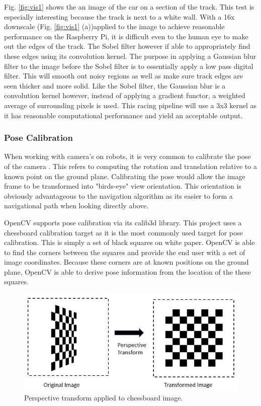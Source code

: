 \documentclass{article}
\begin{document}
Fig. \ref{fig:vis1} shows the an image of the car on a section of the track. This test is especially interesting because the track is next to a white wall. With a 16x downscale (Fig. \ref{fig:vis1} (a))applied to the image to achieve reasonable performance on the Raspberry Pi, it is difficult even to the human eye to make out the edges of the track. The Sobel filter however if able to appropriately find these edges using its convolution kernel. The purpose in applying a Gaussian blur filter to the image before the Sobel filter is to essentially apply a low pass digital filter. This will smooth out noisy regions as well as make sure track edges are seen thicker and more solid. Like the Sobel filter, the Gaussian blur is a convolution kernel however, instead of applying a gradient functor, a weighted average of surrounding pixels is used. This racing pipeline will use a 3x3 kernel as it has reasonable computational performance and yield an acceptable output.

\subsubsection{Pose Calibration}

When working with camera's on robots, it is very common to calibrate the pose of the camera \cite{b1} \cite{b3}. This refers to computing the rotation and translation relative to a known point on the ground plane. Calibrating the pose would allow the image frame to be transformed into "birds-eye" view orientation. This orientation is obviously advantageous to the navigation algorithm as its easier to form a navigational path when looking directly above.

OpenCV supports pose calibration via its calib3d library. This project uses a chessboard calibration target as it is the most commonly used target for pose calibration. This is simply a set of black squares on white paper. OpenCV is able to find the corners between the squares and provide the end user with a set of image coordinates. Because these corners are at known positions on the ground plane, OpenCV is able to derive pose information from the location of the these squares.

\begin{figure}[htb]
	\centering
	\centerline{\includegraphics[width=1.0\linewidth]{perspective}}
	\caption{Perspective transform applied to chessboard image.}
	\label{fig:perspective}
\end{figure}
\end{document}
